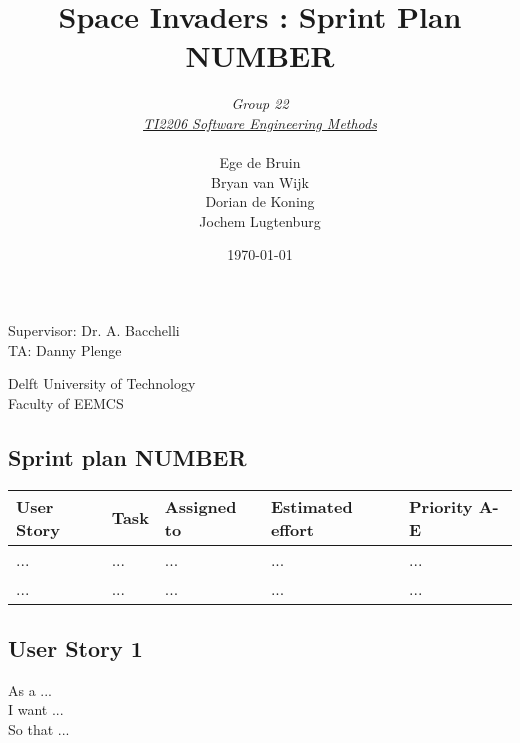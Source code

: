 \documentclass[10pt]{article}
\begin{document}
\title{Space Invaders : Sprint Plan NUMBER}
\date{\today}
\author{\textit{Group 22}\\ \textit{\underline{TI2206 Software Engineering Methods}} \\
 \\Ege de Bruin \\ Bryan van Wijk \\ Dorian de Koning \\ Jochem Lugtenburg }
 \maketitle  
 \begin{center}
Supervisor: Dr. A. Bacchelli\\
TA: Danny Plenge\\
 \end{center}     
 \begin{center}
 Delft University of Technology\\
 Faculty of EEMCS\\
 \end{center}
 \thispagestyle{empty}
 \pagebreak
 
\begin{center}

\section*{Sprint plan NUMBER}

    \hspace*{-3cm}\begin{tabular}{ | p{2cm} | p{9cm} | p{2.1cm} | p{2cm} | p{2cm} |}
    \hline
    User Story & Task & Assigned to & Estimated effort & Priority A-E \\ \hline
    ... & ... & ... & ... & ...\\ 
    ... & ... & ... & ... & ...\\ \hline    
    \end{tabular}
    
\end{center}

\subsection*{User Story 1}
As a ...\\ 
\indent I want ...\\
So that ...
\end{document}
